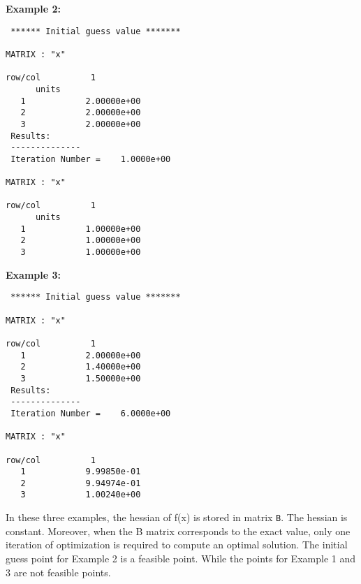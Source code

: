 \noindent
{\bf Example 2:}
\begin{footnotesize}
\begin{verbatim}
 ****** Initial guess value ******* 

MATRIX : "x"

row/col          1          
      units             
   1            2.00000e+00
   2            2.00000e+00
   3            2.00000e+00
 Results: 
 --------------
 Iteration Number =    1.0000e+00 

MATRIX : "x"

row/col          1          
      units             
   1            1.00000e+00
   2            1.00000e+00
   3            1.00000e+00
\end{verbatim}
\end{footnotesize}
\vspace{0.1 in}

\noindent
{\bf Example 3:}
\begin{footnotesize}
\begin{verbatim}
 ****** Initial guess value ******* 

MATRIX : "x"

row/col          1          
   1            2.00000e+00
   2            1.40000e+00
   3            1.50000e+00
 Results: 
 --------------
 Iteration Number =    6.0000e+00 

MATRIX : "x"

row/col          1          
   1            9.99850e-01
   2            9.94974e-01
   3            1.00240e+00
\end{verbatim}
\end{footnotesize}

\vspace{0.15 in}\noindent
In these three examples, the hessian of f(x) is stored in matrix {\tt B}.
The hessian is constant. Moreover, when the B matrix corresponds
to the exact value, only one iteration of optimization is required
to compute an optimal solution.
The initial guess point for Example 2 is a feasible point.
While the points for Example 1 and 3 are not feasible points. 

